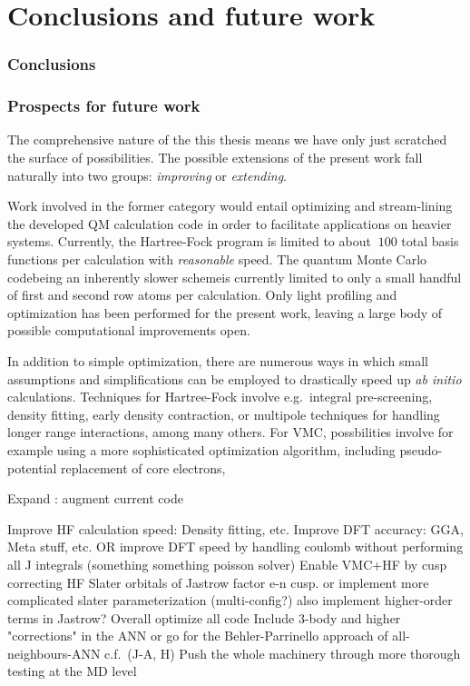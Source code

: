 \documentclass[twoside,english]{uiofysmaster}
\begin{document}
\part{Conclusions and future work}
\section{Conclusions}


\section{Prospects for future work}
The comprehensive nature of the this thesis means we have only just scratched the surface of possibilities. The possible extensions of the present work fall naturally into two groups: \emph{improving} or \emph{extending}. 

Work involved in the former category would entail optimizing and stream-lining the developed QM calculation code in order to facilitate applications on heavier systems. Currently, the Hartree-Fock program is limited to about $~100$ total basis functions per calculation with \emph{reasonable} speed. The quantum Monte Carlo code\textemdash being an inherently slower scheme\textemdash is currently limited to only a small handful of first and second row atoms per calculation. Only light profiling and optimization has been performed for the present work, leaving a large body of possible computational improvements open. 

In addition to simple optimization, there are numerous ways in which small assumptions and simplifications can be employed to drastically speed up \emph{ab initio} calculations. Techniques for Hartree-Fock involve e.g.\ integral pre-screening, density fitting, early density contraction, or multipole techniques for handling longer range interactions, among many others. For VMC, possbilities involve for example using a more sophisticated optimization algorithm, including pseudo-potential replacement of core electrons,  


Expand : augment current code 

Improve HF calculation speed: Density fitting, etc.
Improve DFT accuracy: GGA, Meta stuff, etc. 
OR improve DFT speed by handling coulomb without performing all J integrals (something something poisson solver)
Enable VMC+HF by cusp correcting HF Slater orbitals of Jastrow factor e-n cusp.
or implement more complicated slater parameterization (multi-config?) 
also implement higher-order terms in Jastrow?
Overall optimize all code
Include 3-body and higher "corrections" in the ANN or go for the Behler-Parrinello approach of all-neighbours-ANN c.f.\ (J-A, H)
Push the whole machinery through more thorough testing at the MD level 

\begin{appendices}
\appendixpage
\noappendicestocpagenum
\addappheadtotoc

\end{appendices}



\printbibliography[heading=bibintoc]
\end{document}
